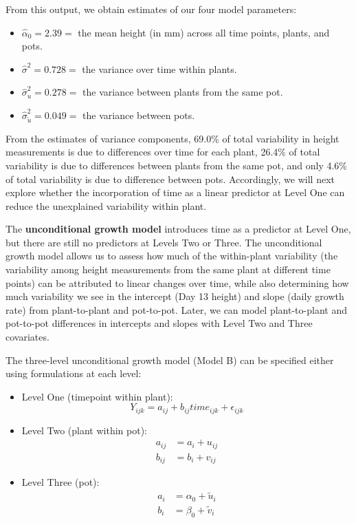\documentclass[
]{krantz}
\providecommand{\tightlist}{%
  \setlength{\itemsep}{0pt}\setlength{\parskip}{0pt}}
\begin{document}
From this output, we obtain estimates of our four model parameters:

\begin{itemize}
\tightlist
\item
  \(\hat{\alpha}_{0}=2.39=\) the mean height (in mm) across all time points, plants, and pots.
\item
  \(\hat{\sigma}^2=0.728=\) the variance over time within plants.
\item
  \(\hat{\sigma}_{u}^{2}=0.278=\) the variance between plants from the same pot.
\item
  \(\hat{\sigma}_{\tilde{u}}^{2}=0.049=\) the variance between pots.
\end{itemize}

From the estimates of variance components, 69.0\% of total variability in height measurements is due to differences over time for each plant, 26.4\% of total variability is due to differences between plants from the same pot, and only 4.6\% of total variability is due to difference between pots. Accordingly, we will next explore whether the incorporation of time as a linear predictor at Level One can reduce the unexplained variability within plant.

The \textbf{unconditional growth model} introduces time as a predictor at Level One, but there are still no predictors at Levels Two or Three. The unconditional growth model allows us to assess how much of the within-plant variability (the variability among height measurements from the same plant at different time points) can be attributed to linear changes over time, while also determining how much variability we see in the intercept (Day 13 height) and slope (daily growth rate) from plant-to-plant and pot-to-pot. Later, we can model plant-to-plant and pot-to-pot differences in intercepts and slopes with Level Two and Three covariates.

The three-level unconditional growth model (Model B) can be specified either using formulations at each level:

\begin{itemize}
\tightlist
\item
  Level One (timepoint within plant):
  \begin{equation}
  Y_{ijk} = a_{ij}+b_{ij}\textstyle{time}_{ijk}+\epsilon_{ijk}
  \label{eq:timewithplnt}
  \end{equation}
\item
  Level Two (plant within pot):
  \begin{align*}
  a_{ij} & = a_{i}+u_{ij} \\
  b_{ij} & = b_{i}+v_{ij}
  \end{align*}
\item
  Level Three (pot):
  \begin{align*}
  a_{i} & = \alpha_{0}+\tilde{u}_{i} \\
  b_{i} & = \beta_{0}+\tilde{v}_{i}
  \end{align*}
\end{itemize}
\end{document}
